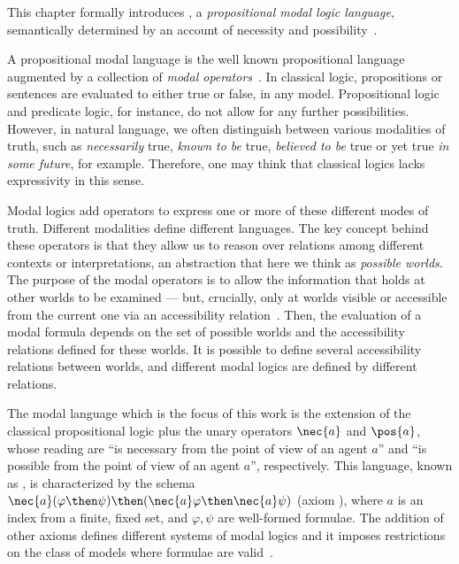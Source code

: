 This chapter formally introduces , a \emph{propositional modal
logic language}, semantically determined by an account of necessity and
possibility~\cite{journals/jal/NalonD07}.

A propositional modal language is the well known propositional language augmented
by a collection of \emph{modal operators}~\cite{blackburn2002modal}. In
classical logic, propositions or sentences are evaluated to either true or
false, in any model. Propositional logic and predicate logic, for instance, do
not allow for any further possibilities. However, in natural language, we often
distinguish between various modalities of truth, such as \emph{necessarily}
true, \emph{known to be} true, \emph{believed to be} true or yet true \emph{in
some future}, for example.  Therefore, one may think that classical logics lacks
expressivity in this sense. 

Modal logics add operators to express one or more of these different modes of
truth. Different modalities define different languages. The key concept behind
these operators is that they allow us to reason over relations among different
contexts or interpretations, an abstraction that here we think as \emph{possible
worlds}.  The purpose of the modal operators is to allow the information that
holds at other worlds to be examined --- but, crucially, only at worlds visible
or accessible from the current one via an accessibility
relation~\cite{blackburn2002modal}. Then, the evaluation of a modal formula
depends on the set of possible worlds and the accessibility relations defined
for these worlds. It is possible to define several accessibility relations
between worlds, and different modal logics are defined by different relations.

The modal language which is the focus of this work is the extension of the
classical propositional logic plus the unary operators $\nec{a}$ and $\pos{a}$,
whose reading are ``is necessary from the point of view of an agent $a$'' and
``is possible from the point of view of an agent $a$'', respectively. This
language, known as , is characterized by the schema
$\nec{a}(\varphi \then \psi) \then (\nec{a} \varphi \then \nec{a} \psi)$ (axiom
), where $a$ is an index from a finite, fixed set, and $\varphi,
\psi$ are well-formed formulae. The addition of other axioms defines different
systems of modal logics and it imposes restrictions on the class of models where
formulae are valid~\cite{chellas:modal_logic}. 

